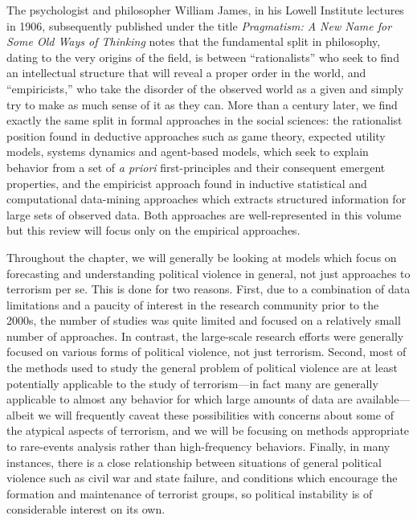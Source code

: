 \documentclass[graybox]{svmult}
\begin{document}
The psychologist and philosopher William James, in his Lowell Institute lectures in 1906, subsequently published under the title \textit{Pragmatism: A New Name for Some Old Ways of Thinking} notes that the fundamental split in philosophy, dating to the very origins of the field, is between ``rationalists'' who seek to find an intellectual structure that will reveal a proper order in the world, and ``empiricists,'' who take the disorder of the observed world as a given and simply try to make as much sense of it as they can. More than a century later, we find exactly the same split in formal approaches in the social sciences: the rationalist position found in deductive approaches such as game theory, expected utility models, systems dynamics and agent-based models, which seek to explain behavior from a set of  \textit{a priori} first-principles and their consequent emergent properties, and the empiricist approach found in inductive statistical and computational data-mining approaches which extracts structured information for large sets of observed data. Both approaches are well-represented in this volume {\color{blue}{[we will insert citations when the table of contents has been finalized]}} but this review will focus only on the empirical approaches.

Throughout the chapter, we will generally be looking at models which focus on forecasting and understanding political violence in general, not just approaches to terrorism per se. This is done for two reasons. First, due to a combination of data limitations and a paucity of interest in the research community prior to the 2000s, the number of studies was quite limited and focused on a relatively small number of approaches. In contrast, the large-scale research efforts were generally focused on various forms of political violence, not just terrorism. Second, most of the methods used to study the general problem of political violence are at least potentially applicable to the study of terrorism---in fact many are generally applicable to almost any behavior for which large amounts of data are available---albeit we will frequently caveat these possibilities with concerns about some of the atypical aspects of terrorism, and we will be focusing on methods appropriate to rare-events analysis rather than high-frequency behaviors. Finally, in many instances, there is a close relationship between situations of general political violence such as civil war and state failure, and conditions which encourage the formation and maintenance of terrorist groups, so political instability is of considerable interest on its own. 
\end{document}
